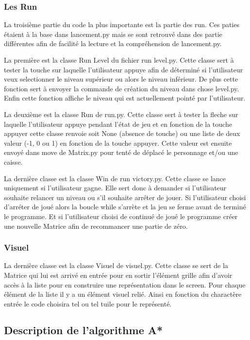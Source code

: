 \documentclass[a4paper,12pt]{article} %
\begin{document}
\subsubsection{Les Run}

La troisième partie du code la plus importante est la partie des run.
Ces paties étaient à la base dans lancement.py mais se sont retrouvé dans des partie différentes afin de facilité la lecture et la compréhension de lancement.py.

La première est la classe Run Level du fichier run level.py.
Cette classe sert à tester la touche sur laquelle l'utilisateur appuye afin de déterminé si l'utilisateur veux selectionner le niveau supérieur ou alors le niveau inférieur.
De plus cette fonction sert à envoyer la commande de création du niveau dans chose level.py.
Enfin cette fonction affiche le niveau qui est actuellement pointé par l'utilisateur.

La deuxième est la classe Run de run.py.
Cette classe sert à tester la fleche sur laquelle l'utilisateur appuye pendant l'état de jeu et en fonction de la touche appuyer cette classe renvoie soit None (absence de touche) ou une liste de deux valeur (-1, 0 ou 1) en fonction de la touche appuyer.
Cette valeur est ensuite envoyé dans move de Matrix.py pour tenté de déplacé le personnage et/ou une caisse.

La dernière classe est la classe Win de run victory.py.
Cette classe se lance uniquement si l'utilisateur gagne.
Elle sert donc à demander si l'utilisateur souhaite relancer un niveau ou s'il souhaite arréter de jouer.
Si l'utilisateur choisi d'arréter de joué alors la boucle while s'arrète et la jeu se ferme avant de terminé le programme.
Et si l'utilisateur choisi de continué de joué le programme créer une nouvelle Matrice afin de recommancer une partie de zéro.

\subsubsection{Visuel}

La dernière classe est la classe Visuel de visuel.py.
Cette classe se sert de la Matrice qui lui est arrivé en entrée pour en sortir l'élément grille afin d'avoir accès à la liste pour en construire une représentation dans le screen.
Pour chaque élément de la liste il y a un élément visuel relié.
Ainsi en fonction du charactère entrée le code choisira tel ou tel tuile pour le représenté.

\subsection{Description de l'algorithme A*}
\end{document}
